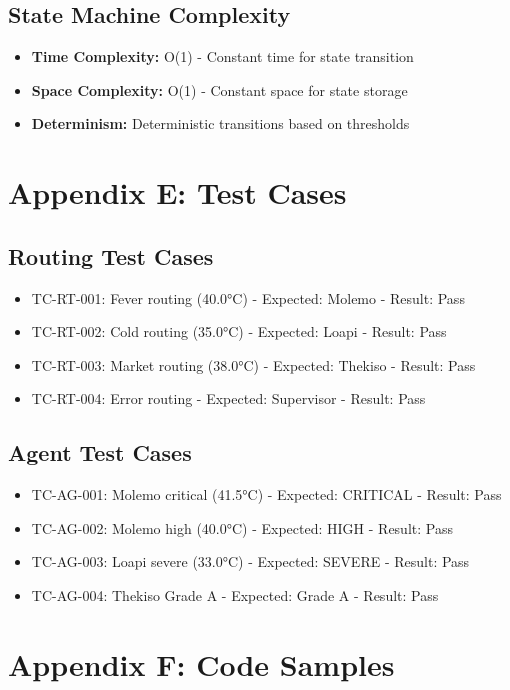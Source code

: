 \subsection*{State Machine Complexity}
\begin{itemize}
    \item \textbf{Time Complexity:} O(1) - Constant time for state transition
    \item \textbf{Space Complexity:} O(1) - Constant space for state storage
    \item \textbf{Determinism:} Deterministic transitions based on thresholds
\end{itemize}

\section*{Appendix E: Test Cases}

\subsection*{Routing Test Cases}
\begin{itemize}
    \item TC-RT-001: Fever routing (40.0°C) - Expected: Molemo - Result: Pass
    \item TC-RT-002: Cold routing (35.0°C) - Expected: Loapi - Result: Pass
    \item TC-RT-003: Market routing (38.0°C) - Expected: Thekiso - Result: Pass
    \item TC-RT-004: Error routing - Expected: Supervisor - Result: Pass
\end{itemize}

\subsection*{Agent Test Cases}
\begin{itemize}
    \item TC-AG-001: Molemo critical (41.5°C) - Expected: CRITICAL - Result: Pass
    \item TC-AG-002: Molemo high (40.0°C) - Expected: HIGH - Result: Pass
    \item TC-AG-003: Loapi severe (33.0°C) - Expected: SEVERE - Result: Pass
    \item TC-AG-004: Thekiso Grade A - Expected: Grade A - Result: Pass
\end{itemize}

\section*{Appendix F: Code Samples}

